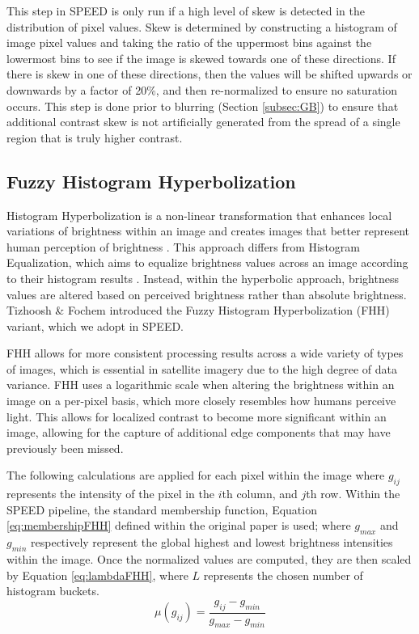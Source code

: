 \documentclass[conference]{IEEEtran}
\begin{document}
This step in SPEED is only run if a high level of skew is detected in the distribution of pixel values. Skew is determined by constructing a histogram of image pixel values and taking the ratio of the uppermost bins against the lowermost bins to see if the image is skewed towards one of these directions. If there is skew in one of these directions, then the values will be shifted upwards or downwards by a factor of 20\%, and then re-normalized to ensure no saturation occurs. This step is done prior to blurring (Section \ref{subsec:GB}) to ensure that additional contrast skew is not artificially generated from the spread of a single region that is truly higher contrast.

\subsection{Fuzzy Histogram Hyperbolization}
\label{subsec:FHH}

Histogram Hyperbolization is a non-linear transformation that enhances local variations of brightness within an image and creates images that better represent human perception of brightness \cite{Frei1977}. This approach differs from Histogram Equalization, which aims to equalize brightness values across an image according to their histogram results \cite{PatelEtAl2013}. Instead, within the hyperbolic approach, brightness values are altered based on perceived brightness rather than absolute brightness. Tizhoosh \& Fochem \cite{TizhooshFochem1995} introduced the Fuzzy Histogram Hyperbolization (FHH) variant, which we adopt in SPEED. 

FHH allows for more consistent processing results across a wide variety of types of images, which is essential in satellite imagery due to the high degree of data variance. FHH uses a logarithmic scale when altering the brightness within an image on a per-pixel basis, which more closely resembles how humans perceive light. This allows for localized contrast to become more significant within an image, allowing for the capture of additional edge components that may have previously been missed. 

The following calculations are applied for each pixel within the image where $g_{ij}$ represents the intensity of the pixel in the $i$th column, and $j$th row. Within the SPEED pipeline, the standard membership function, Equation \ref{eq:membershipFHH} defined within the original paper is used; where $g_{max}$ and $g_{min}$ respectively represent the global highest and lowest brightness intensities within the image. Once the normalized values are computed, they are then scaled by Equation \ref{eq:lambdaFHH}, where $L$ represents the chosen number of histogram buckets. 
\begin{equation}
    \label{eq:membershipFHH}
    \mu (g_{ij}) = \frac{g_{ij}-g_{min}}{g_{max}-g_{min}}
\end{equation}
\end{document}
